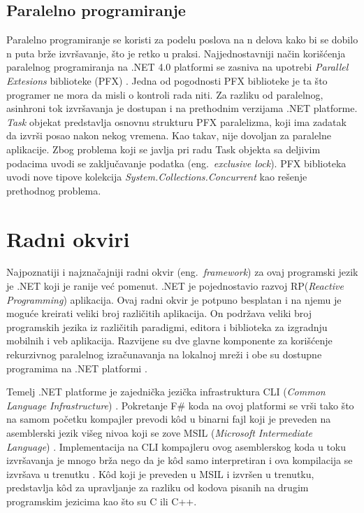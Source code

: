 \documentclass[a4paper]{article}
\begin{document}
\subsection{Paralelno programiranje}

Paralelno programiranje se koristi za podelu poslova na n delova kako bi se dobilo n puta brže izvršavanje, što je retko u praksi. Najjednostavniji način korišćenja paralelnog programiranja na .NET 4.0 platformi se zasniva na upotrebi {\em Parallel Extesions} biblioteke (PFX) \cite{progFs}. Jedna od pogodnosti PFX biblioteke je ta što programer ne mora da misli o kontroli rada niti. Za razliku od paralelnog, asinhroni tok izvršavanja je dostupan i na prethodnim verzijama .NET platforme. {\em Task} objekat predstavlja osnovnu strukturu PFX paralelizma, koji ima zadatak da izvrši posao nakon nekog vremena. Kao takav, nije dovoljan za paralelne aplikacije. Zbog problema koji se javlja pri radu Task objekta sa deljivim podacima uvodi se zaključavanje podatka (eng.~{\em exclusive lock}). PFX biblioteka uvodi nove tipove kolekcija {\em System.Collections.Concurrent} \cite{sysCC} kao rešenje prethodnog problema.  


\section{Radni okviri}

Najpoznatiji i najznačajniji radni okvir (eng.~{\em framework}) za ovaj programski jezik je .NET koji je ranije već pomenut. .NET je pojednostavio razvoj RP({\em Reactive Programming}) \cite{RPapp} aplikacija. Ovaj radni okvir je potpuno besplatan i na njemu je moguće kreirati veliki broj različitih aplikacija. On podržava veliki broj programskih jezika iz različitih paradigmi, editora i biblioteka za izgradnju mobilnih i veb aplikacija. Razvijene su dve glavne komponente za korišćenje rekurzivnog paralelnog izračunavanja na lokalnoj mreži i obe su dostupne programima na .NET platformi \cite{ppNETframework}. 

Temelj .NET platforme je zajednička jezička infrastruktura CLI ({\em Common Language Infrastructure}) \cite{cli}. Pokretanje F\# koda na ovoj platformi se vrši tako što na samom početku kompajler prevodi kôd u binarni fajl koji je preveden na asemblerski jezik višeg nivoa koji se zove MSIL ({\em Microsoft Intermediate Language}) \cite{msil}. Implementacija na CLI kompajleru ovog asemblerskog koda u toku izvršavanja je mnogo brža nego da je kôd samo interpretiran i ova kompilacija se izvršava u trenutku \cite{progFs}.
Kôd koji je preveden u MSIL i izvršen u trenutku, predstavlja kôd za upravljanje za razliku od kodova pisanih na drugim programskim jezicima kao što su C ili C++.   
\end{document}
